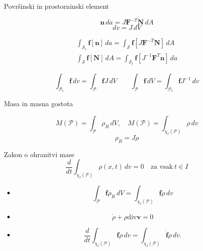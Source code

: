 \documentclass{beamer}
\newcommand{\vek}[1]{\boldsymbol #1} %
\newcommand{\ten}[1]{\mathbf #1} %
\renewcommand{\div}{\mathrm{div}} %
\begin{document}
\begin{frame}{Površinski in prostorninski element}

\begin{equation*}
	\vek{n}\,da=J\ten{F}^{-T}\vek{N}\,dA
\end{equation*}
\begin{equation*}
	dv=J\,dV
\end{equation*}

\begin{align*}
	\int_{\mathcal{S}_t}\vek{f}[\vek{n}]\,da=\int_{\mathcal{S}}\vek{f}[J\ten{F}^{-T}\vek{N}]\,dA\\
	\int_{\mathcal{S}}\vek{f}[\vek{N}]\,dA=\int_{\mathcal{S}_t}\vek{f}[J^{-1}\ten{F}^{T}\vek{n}]\,da
\end{align*}

\begin{equation*}
	\int_{\mathcal{P}_t}\vek{f}\,dv=\int_{\mathcal{P}}\vek{f}J\,dV \qquad
	\int_{\mathcal{P}}\vek{f}\,dV=\int_{\mathcal{P}_t}\vek{f}J^{-1}\,dv
\end{equation*}

\end{frame}


\begin{frame}{Masa in masna gostota}

\[ M(\mathcal{P})=\int_{\mathcal{P}}\rho_R\,dV,\quad M(\mathcal{P})=\int_{\chi_t(\mathcal{P})}\rho\,dv \]
\[ \rho_R=J\rho \]

\begin{block}{Zakon o ohranitvi mase}
	\[ \frac{d}{dt}\int_{\chi_t(\mathcal{P})}\rho(x,t)\,dv = 0\quad\textrm{za vsak}\ t\in I \]
\end{block}

\begin{itemize}
	\item \[ \int_{\mathcal{P}}\vek{f}\rho_R\,dV=\int_{\chi_t(\mathcal{P})}\vek{f}\rho\,dv \]
	\item \[ \dot{\rho}+\rho\div\vek{v}=0 \]
	\item \[
		\frac{d}{dt}\int_{\chi_t(\mathcal{P})}\vek{f}\rho\,dv=
		\int_{\chi_t(\mathcal{P})}\dot{\vek{f}}\rho\,dv.
	\]
\end{itemize}

\end{frame}
\end{document}
